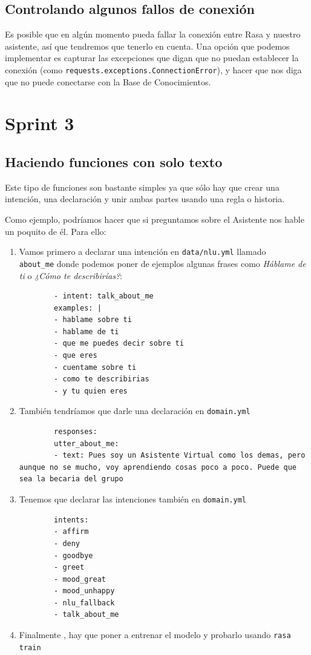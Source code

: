 \subsection{Controlando algunos fallos de conexión}
Es posible que en algún momento pueda fallar la conexión entre Rasa y nuestro asistente, así que tendremos que tenerlo en cuenta. Una opción que podemos implementar es capturar las excepciones que digan que no puedan establecer la conexión (como \texttt{requests.exceptions.ConnectionError}), y hacer que nos diga que no puede conectarse con la Base de Conocimientos.

\section{Sprint 3}
\subsection{Haciendo funciones con solo texto}
Este tipo de funciones son bastante simples ya que sólo hay que crear una intención, una declaración y unir ambas partes usando una regla o historia.

Como ejemplo, podríamos hacer que si preguntamos sobre el Asistente nos hable un poquito de él. Para ello:

\begin{enumerate}
	\item Vamos primero a declarar una intención en \texttt{data/nlu.yml} llamado \\ \texttt{about\_me} donde podemos poner de ejemplos algunas frases como \textit{Háblame de ti} o \textit{¿Cómo te describirías?}:
	\begin{lstlisting}
		- intent: talk_about_me
		examples: |
		- hablame sobre ti
		- hablame de ti
		- que me puedes decir sobre ti
		- que eres
		- cuentame sobre ti
		- como te describirias
		- y tu quien eres
	\end{lstlisting}

	\item También tendríamos que darle una declaración en \texttt{domain.yml}
	\begin{lstlisting}
		responses:
		utter_about_me:
		- text: Pues soy un Asistente Virtual como los demas, pero aunque no se mucho, voy aprendiendo cosas poco a poco. Puede que sea la becaria del grupo
	\end{lstlisting}

	\item Tenemos que declarar las intenciones también en \texttt{domain.yml}
	\begin{lstlisting}
		intents:
		- affirm
		- deny
		- goodbye
		- greet
		- mood_great
		- mood_unhappy
		- nlu_fallback
		- talk_about_me
	\end{lstlisting}

	\item Finalmente , hay que poner a entrenar el modelo y probarlo usando \texttt{rasa train}
\end{enumerate}

